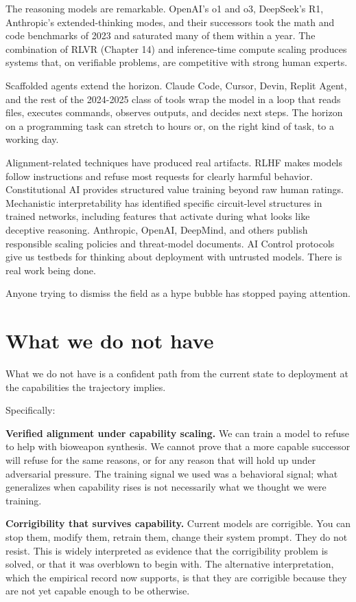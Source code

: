 The reasoning models are remarkable. OpenAI's o1 and o3, DeepSeek's R1, Anthropic's extended-thinking modes, and their successors took the math and code benchmarks of 2023 and saturated many of them within a year. The combination of RLVR (Chapter 14) and inference-time compute scaling produces systems that, on verifiable problems, are competitive with strong human experts.

Scaffolded agents extend the horizon. Claude Code, Cursor, Devin, Replit Agent, and the rest of the 2024-2025 class of tools wrap the model in a loop that reads files, executes commands, observes outputs, and decides next steps. The horizon on a programming task can stretch to hours or, on the right kind of task, to a working day.

Alignment-related techniques have produced real artifacts. RLHF makes models follow instructions and refuse most requests for clearly harmful behavior. Constitutional AI provides structured value training beyond raw human ratings. Mechanistic interpretability has identified specific circuit-level structures in trained networks, including features that activate during what looks like deceptive reasoning. Anthropic, OpenAI, DeepMind, and others publish responsible scaling policies and threat-model documents. AI Control protocols give us testbeds for thinking about deployment with untrusted models. There is real work being done.

Anyone trying to dismiss the field as a hype bubble has stopped paying attention.

\section*{What we do not have}

What we do not have is a confident path from the current state to deployment at the capabilities the trajectory implies.

Specifically:

\textbf{Verified alignment under capability scaling.} We can train a model to refuse to help with bioweapon synthesis. We cannot prove that a more capable successor will refuse for the same reasons, or for any reason that will hold up under adversarial pressure. The training signal we used was a behavioral signal; what generalizes when capability rises is not necessarily what we thought we were training.

\textbf{Corrigibility that survives capability.} Current models are corrigible. You can stop them, modify them, retrain them, change their system prompt. They do not resist. This is widely interpreted as evidence that the corrigibility problem is solved, or that it was overblown to begin with. The alternative interpretation, which the empirical record now supports, is that they are corrigible because they are not yet capable enough to be otherwise.

